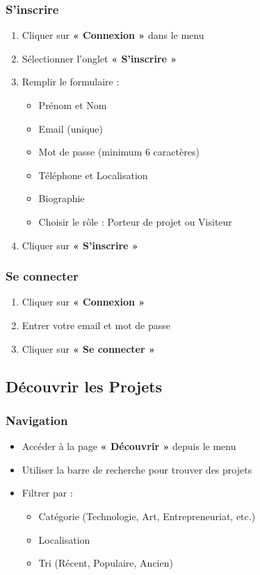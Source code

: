 \documentclass[12pt,a4paper]{article}
\begin{document}
\subsubsection{S'inscrire}
\begin{enumerate}[leftmargin=*]
    \item Cliquer sur \textbf{« Connexion »} dans le menu
    \item Sélectionner l'onglet \textbf{« S'inscrire »}
    \item Remplir le formulaire :
    \begin{itemize}
        \item Prénom et Nom
        \item Email (unique)
        \item Mot de passe (minimum 6 caractères)
        \item Téléphone et Localisation
        \item Biographie
        \item Choisir le rôle : Porteur de projet ou Visiteur
    \end{itemize}
    \item Cliquer sur \textbf{« S'inscrire »}
\end{enumerate}

\subsubsection{Se connecter}
\begin{enumerate}[leftmargin=*]
    \item Cliquer sur \textbf{« Connexion »}
    \item Entrer votre email et mot de passe
    \item Cliquer sur \textbf{« Se connecter »}
\end{enumerate}

\subsection{Découvrir les Projets}

\subsubsection{Navigation}
\begin{itemize}[leftmargin=*]
    \item Accéder à la page \textbf{« Découvrir »} depuis le menu
    \item Utiliser la barre de recherche pour trouver des projets
    \item Filtrer par :
    \begin{itemize}
        \item Catégorie (Technologie, Art, Entrepreneuriat, etc.)
        \item Localisation
        \item Tri (Récent, Populaire, Ancien)
    \end{itemize}
\end{itemize}
\end{document}
